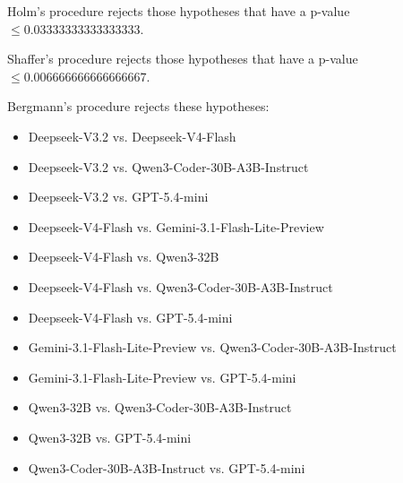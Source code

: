 \documentclass[a4paper,10pt]{article}
\begin{document}
\begin{landscape}
Holm's procedure rejects those hypotheses that have a p-value $\le0.03333333333333333$.


Shaffer's procedure rejects those hypotheses that have a p-value $\le0.006666666666666667$.


Bergmann's procedure rejects these hypotheses:


\begin{itemize}


\item Deepseek-V3.2 vs. Deepseek-V4-Flash
\item Deepseek-V3.2 vs. Qwen3-Coder-30B-A3B-Instruct
\item Deepseek-V3.2 vs. GPT-5.4-mini
\item Deepseek-V4-Flash vs. Gemini-3.1-Flash-Lite-Preview
\item Deepseek-V4-Flash vs. Qwen3-32B
\item Deepseek-V4-Flash vs. Qwen3-Coder-30B-A3B-Instruct
\item Deepseek-V4-Flash vs. GPT-5.4-mini
\item Gemini-3.1-Flash-Lite-Preview vs. Qwen3-Coder-30B-A3B-Instruct
\item Gemini-3.1-Flash-Lite-Preview vs. GPT-5.4-mini
\item Qwen3-32B vs. Qwen3-Coder-30B-A3B-Instruct
\item Qwen3-32B vs. GPT-5.4-mini
\item Qwen3-Coder-30B-A3B-Instruct vs. GPT-5.4-mini
\end{itemize}



\end{landscape}
\end{document}
